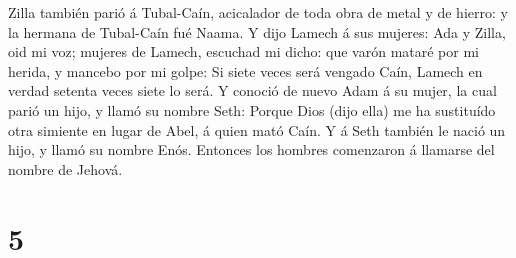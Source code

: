 Zilla también parió á Tubal-Caín, acicalador de toda obra de metal y de
hierro: y la hermana de Tubal-Caín fué Naama.  Y dijo
Lamech á sus mujeres: Ada y Zilla, oid mi voz; mujeres de Lamech,
escuchad mi dicho: que varón mataré por mi herida, y mancebo por mi
golpe:  Si siete veces será vengado Caín, Lamech en
verdad setenta veces siete lo será.  Y conoció de nuevo
Adam á su mujer, la cual parió un hijo, y llamó su nombre Seth: Porque
Dios (dijo ella) me ha sustituído otra simiente en lugar de Abel, á
quien mató Caín.  Y á Seth también le nació un hijo, y
llamó su nombre Enós. Entonces los hombres comenzaron á llamarse del
nombre de Jehová.

\hypertarget{section-4}{%
\section{5}\label{section-4}}

